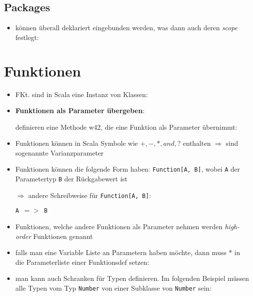 \subsection{Packages}
\begin{itemize}
  \item können überall deklariert \und eingebunden werden, was dann
  auch deren \textit{scope} festlegt:
  
  
  
\end{itemize}
\pagebreak


\section{Funktionen}
\begin{itemize}
  \item FKt. sind in Scala eine Instanz von Klassen:
  
  
  
  \item \textbf{Funktionen als Parameter übergeben}:
  
  definieren eine Methode w42, die eine Funktion als Parameter übernimmt:
  
  

  \item Funktionen können in Scala Symbole wie $+, -, *, and, ?$ enthalten
  $\Rightarrow$ sind sogenannte Varianzparameter
  \item Funktionen können die folgende Form
  haben: \texttt{Function[A, B]}, wobei \texttt{A} der Parametertyp 
  \und \texttt{B} der Rückgabewert ist
  
  $\Rightarrow$ andere Schreibweise für \texttt{Function[A, B]}:
  
  \begin{center}
    \texttt{A $=>$ B}
  \end{center}
    
  \item Funktionen, welche andere Funktionen als Parameter nehmen werden
  \textit{high-order} Funktionen genannt
    \item falls man eine Variable Liste an Parametern haben möchte, dann muss *
  in die Parameterliste einer Funktionsdef setzen:
  

    
  \item man kann auch Schranken für Typen definieren. Im folgenden Beispiel 
  müssen alle Typen vom Typ \texttt{Number} \oder von einer Subklasse von
  \texttt{Number} sein:
  
  

\end{itemize}


